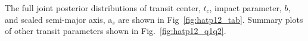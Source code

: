 The full joint posterior distributions of transit center, $t_c$, impact parameter, $b$, and scaled semi-major axis, a$_s$ are shown in Fig~\ref{fig:hatp12_tab}. Summary plots of other transit parameters shown in Fig.~\ref{fig:hatp12_q1q2}.

 
